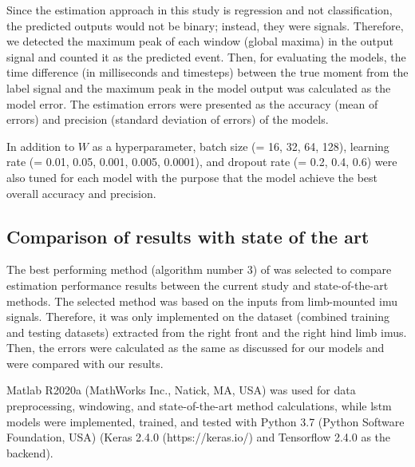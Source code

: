 Since the estimation approach in this study is regression and not classification, the predicted outputs would not be binary; instead, they were signals. Therefore, we detected the maximum peak of each window (global maxima) in the output signal and counted it as the predicted event. Then, for evaluating the models, the time difference (in milliseconds and timesteps) between the true moment from the label signal and the maximum peak in the model output was calculated as the model error. The estimation errors were presented as the accuracy (mean of errors) and precision (standard deviation of errors) of the models.

In addition to $W$ as a hyperparameter, batch size (= 16, 32, 64, 128), learning rate (= 0.01, 0.05, 0.001, 0.005, 0.0001), and dropout rate (= 0.2, 0.4, 0.6) were also tuned for each model with the purpose that the model achieve the best overall accuracy and precision.

\subsection{Comparison of results with state of the art}
The best performing method (algorithm number 3) of \cite{adsd1} was selected to compare estimation performance results between the current study and state-of-the-art methods. The selected method was based on the inputs from limb-mounted \gls{imu} signals. Therefore, it was only implemented on the dataset (combined training and testing datasets) extracted from the right front and the right hind limb \gls{imu}s. Then, the errors were calculated as the same as discussed for our models and were compared with our results.

Matlab R2020a (MathWorks Inc., Natick, MA, USA) was used for data preprocessing, windowing, and state-of-the-art method calculations, while \gls{lstm} models were implemented, trained, and tested with Python 3.7 (Python Software Foundation, USA) (Keras 2.4.0 (https://keras.io/) and Tensorflow 2.4.0 as the backend).



